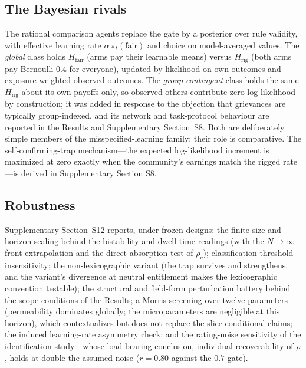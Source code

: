 \documentclass[11pt]{article}
\newcommand{\1}{\mathbf{1}}
\begin{document}
\subsection{The Bayesian rivals}
The rational comparison agents replace the gate by a posterior over rule validity, with effective learning rate $\alpha\,\pi_t(\mathrm{fair})$ and choice on model-averaged values. The \emph{global} class holds $H_{\mathrm{fair}}$ (arms pay their learnable means) versus $H_{\mathrm{rig}}$ (both arms pay Bernoulli $0.4$ for everyone), updated by likelihood on own outcomes and exposure-weighted observed outcomes. The \emph{group-contingent} class holds the same $H_{\mathrm{rig}}$ about its own payoffs only, so observed others contribute zero log-likelihood by construction; it was added in response to the objection that grievances are typically group-indexed, and its network and task-protocol behaviour are reported in the Results and Supplementary Section~S8. Both are deliberately simple members of the misspecified-learning family\cite{EspondaPouzo2016,HeidhuesKoszegiStrack2018,Bohren2016}; their role is comparative. The self-confirming-trap mechanism---the expected log-likelihood increment is maximized at zero exactly when the community's earnings match the rigged rate---is derived in Supplementary Section S8.

\subsection{Robustness}
Supplementary Section~S12 reports, under frozen designs: the finite-size and horizon scaling behind the bistability and dwell-time readings (with the $N\to\infty$ front extrapolation and the direct absorption test of $\rho_c$); classification-threshold insensitivity; the non-lexicographic variant (the trap survives and strengthens, and the variant's divergence at neutral entitlement makes the lexicographic convention testable); the structural and field-form perturbation battery behind the scope conditions of the Results; a Morris screening over twelve parameters (permeability dominates globally; the microparameters are negligible at this horizon), which contextualizes but does not replace the slice-conditional claims; the induced learning-rate asymmetry check; and the rating-noise sensitivity of the identification study---whose load-bearing conclusion, individual recoverability of $\rho$, holds at double the assumed noise ($r=0.80$ against the $0.7$ gate).
\end{document}
